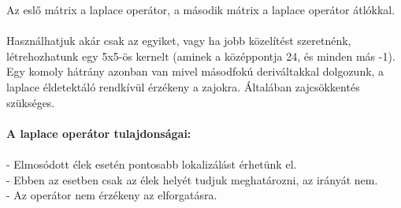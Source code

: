 Az eslő mátrix a laplace operátor, a második mátrix a laplace operátor átlókkal.\\ \\
Használhatjuk akár csak az egyiket, vagy ha jobb közelítést szeretnénk, létrehozhatunk egy 5x5-ös kernelt (aminek a középpontja 24, és minden más -1). Egy komoly hátrány azonban van mivel másodfokú deriváltakkal dolgozunk, a laplace éldetektáló rendkívül érzékeny a zajokra. Általában zajcsökkentés szükséges.
\\ \\
\textbf{A laplace operátor tulajdonságai:}\\ \\
\indent - Elmosódott élek esetén pontosabb lokalizálást érhetünk el.\\
\indent - Ebben az esetben csak az élek helyét tudjuk meghatározni, az irányát nem.\\
\indent - Az operátor nem érzékeny az elforgatásra.


